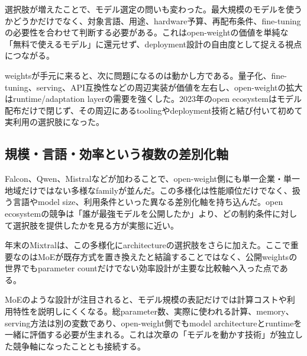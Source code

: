 選択肢が増えたことで、モデル選定の問いも変わった。最大規模のモデルを使うかどうかだけでなく、対象言語、用途、hardware予算、再配布条件、fine-tuningの必要性を合わせて判断する必要がある。これはopen-weightの価値を単純な「無料で使えるモデル」に還元せず、deployment設計の自由度として捉える視点につながる。\autocite{src-00c370ab2324,src-1fd43f93adcc,src-240ca564b6b8,src-3db09fede330,src-5c8e2db8871a,src-74aa7e2a7ca4,src-81f670ec1e74,src-8bdb904686fb,src-9df482e2c96c,src-b7e5243e6d59,src-bc7aba201f01,src-d4b6359bbad1,src-dd2cfa98160d,src-f0349196879e}


weightsが手元に来ると、次に問題になるのは動かし方である。量子化、fine-tuning、serving、API互換性などの周辺実装が価値を左右し、open-weightの拡大はruntime/adaptation layerの需要を強くした。2023年のopen ecosystemはモデル配布だけで閉じず、その周辺にあるtoolingやdeployment技術と結び付いて初めて実利用の選択肢になった。\autocite{src-00c370ab2324,src-240ca564b6b8,src-3db09fede330,src-8bdb904686fb,src-9df482e2c96c,src-b7e5243e6d59,src-bc7aba201f01,src-dd2cfa98160d,src-f0349196879e}


\subsection{規模・言語・効率という複数の差別化軸}

Falcon、Qwen、Mistralなどが加わることで、open-weight側にも単一企業・単一地域だけではない多様なfamilyが並んだ。この多様化は性能順位だけでなく、扱う言語やmodel size、利用条件といった異なる差別化軸を持ち込んだ。open ecosystemの競争は「誰が最強モデルを公開したか」より、どの制約条件に対して選択肢を提供したかを見る方が実態に近い。\autocite{src-00c370ab2324,src-1fd43f93adcc,src-5c8e2db8871a,src-74aa7e2a7ca4,src-81f670ec1e74,src-d4b6359bbad1,src-dd2cfa98160d,src-f0349196879e}


年末のMixtralは、この多様化にarchitectureの選択肢をさらに加えた。ここで重要なのはMoEが既存方式を置き換えたと結論することではなく、公開weightsの世界でもparameter countだけでない効率設計が主要な比較軸へ入った点である。\autocite{src-00c370ab2324,src-dd2cfa98160d,src-f0349196879e}


MoEのような設計が注目されると、モデル規模の表記だけでは計算コストや利用特性を説明しにくくなる。総parameter数、実際に使われる計算、memory、serving方法は別の変数であり、open-weight側でもmodel architectureとruntimeを一緒に評価する必要が生まれる。これは次章の「モデルを動かす技術」が独立した競争軸になったこととも接続する。\autocite{src-00c370ab2324,src-dd2cfa98160d,src-f0349196879e}


